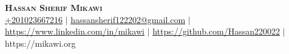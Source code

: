 \documentclass[letterpaper,10.5pt]{article}
\makeatletter
\newcommand{\resumeEducationHeading}[6]{
  \vspace{-2pt}\item
    \begin{tabular*}{0.97\textwidth}[t]{l@{\extracolsep{\fill}}r}
      \textbf{#1} & #2 \\
      \textit{\small#3} & \textit{\small #4} \\
      \textit{\small#5} & \textit{\small #6} \\
    \end{tabular*}\vspace{-5pt}
}
\makeatother
\begin{document}

\begin{center}
    \textbf{\Huge \scshape Hassan Sherif Mikawi} \\ \vspace{5pt}
    \small
    \hspace{.5pt} \href{tel:+201023667216}{+201023667216}
    $|$
    \hspace{.5pt} \href{mailto:hassansherif122202@gmail.com}{hassansherif122202@gmail.com}
    $|$
    \hspace{.5pt} \href{https://www.linkedin.com/in/mikawi}{https://www.linkedin.com/in/mikawi}
    $|$
    \hspace{.5pt} \href{https://github.com/Hassan220022}{https://github.com/Hassan220022}
    $|$
    https://mikawi.org
\end{center}



  
\end{document}
